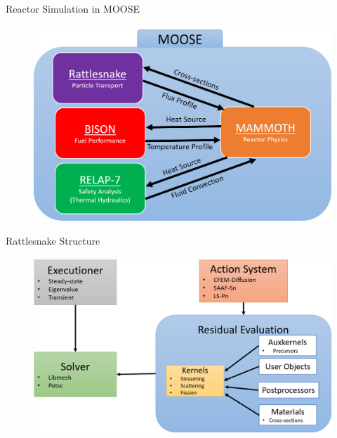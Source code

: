 \documentclass[8pt,xcolor=dvipnames]{beamer}
\begin{document}
\begin{frame}{Reactor Simulation in MOOSE}

\begin{figure}
\includegraphics[width=\linewidth]{figures/mammoth.png}
\end{figure}

\end{frame}

\begin{frame}{Rattlesnake Structure}

\begin{figure}
\includegraphics[width=\linewidth,height=\textheight,keepaspectratio]{figures/rattlesnake.png}
\end{figure}

\end{frame}
\end{document}
